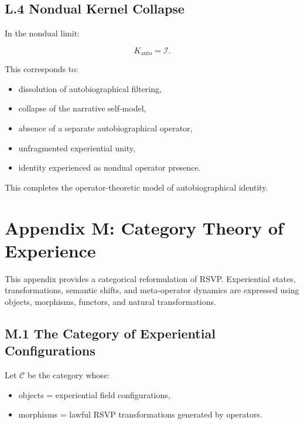 \documentclass[12pt]{article}
\begin{document}
\subsection*{L.4 Nondual Kernel Collapse}

In the nondual limit:

\[
K_{\text{auto}} = \mathcal{I}.
\]

This corresponds to:

\begin{itemize}
    \item dissolution of autobiographical filtering,
    \item collapse of the narrative self-model,
    \item absence of a separate autobiographical operator,
    \item unfragmented experiential unity,
    \item identity experienced as nondual operator presence.
\end{itemize}

This completes the operator-theoretic model of autobiographical identity.


\section*{Appendix M: Category Theory of Experience}

This appendix provides a categorical reformulation of RSVP. Experiential states,
transformations, semantic shifts, and meta-operator dynamics are expressed using
objects, morphisms, functors, and natural transformations.

\subsection*{M.1 The Category of Experiential Configurations}

Let $\mathcal{C}$ be the category whose:

\begin{itemize}
    \item objects = experiential field configurations,
    \item morphisms = lawful RSVP transformations generated by operators.
\end{itemize}
\end{document}
